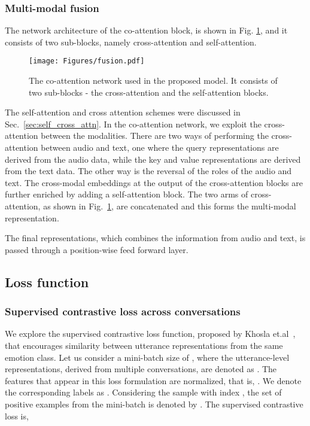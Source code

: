 \documentclass[lettersize,journal]{IEEEtran}
\begin{document}
\subsubsection{Multi-modal fusion}\label{coatt}
The network architecture of the co-attention block, is shown in Fig. \ref{fig:attention}, and it consists of two sub-blocks, namely cross-attention and self-attention. 
\begin{figure}
    \centering
    \texttt{[image: Figures/fusion.pdf]}
    \caption{The co-attention network used in the proposed model. It consists of two sub-blocks - the cross-attention and the self-attention blocks.}
    \label{fig:attention}
\end{figure}
The self-attention and cross attention schemes were discussed in Sec.~\ref{sec:self_cross_attn}. In the co-attention network, we exploit the cross-attention between the modalities. 
There are two ways of performing the cross-attention between audio and text, one where the query representations are derived from the audio data, while the key and value representations are derived from the text data.
The other way is the reversal of the roles of the audio and text. The cross-modal embeddings at the output of the cross-attention blocks are further enriched by adding a self-attention block.  The two arms of cross-attention, as shown in Fig.~\ref{fig:attention}, are concatenated and this forms the multi-modal representation. 

The final representations, which combines the information from audio and text, is passed through a position-wise feed forward layer. 




\subsection{Loss function}\label{loss}
\subsubsection{Supervised contrastive loss across conversations}\label{supconlossdescr}
We explore the supervised contrastive loss function, proposed by Khosla et.al~\cite{khosla2020supervised}, that encourages similarity between utterance representations from the same emotion class. Let us consider a mini-batch size of , where the utterance-level representations, derived from multiple conversations,  are denoted as . The features that appear in this loss formulation are normalized, that is, . We denote the corresponding labels as . Considering the sample with index , the set of positive examples from the mini-batch is denoted by . The supervised contrastive loss is,
\end{document}
